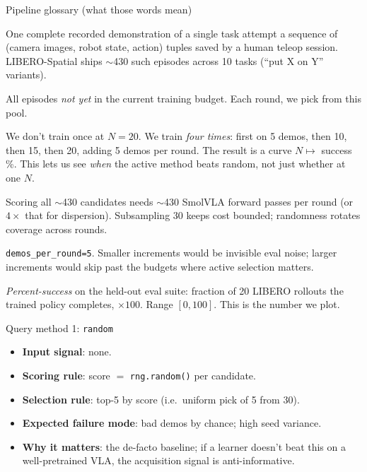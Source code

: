 \documentclass[aspectratio=169]{beamer}
\begin{document}
\begin{frame}{Pipeline glossary (what those words mean)}
\footnotesize
\begin{description}
  \setlength{\itemsep}{0.35em}
  \item[Episode] One complete recorded demonstration of a single task attempt \textemdash{} a sequence of (camera images, robot state, action) tuples saved by a human teleop session. LIBERO-Spatial ships $\sim$430 such episodes across 10 tasks (``put X on Y'' variants).

  \item[Candidate pool] All episodes \emph{not yet} in the current training budget. Each round, we pick from this pool.

  \item[Budget schedule \boldmath$N{=}5\to10\to15\to20$] We don't train once at $N{=}20$. We train \emph{four times}: first on 5 demos, then 10, then 15, then 20, adding 5 demos per round. The result is a curve $N \mapsto $ success\,\%. This lets us see \emph{when} the active method beats random, not just whether at one $N$.

  \item[Why subsample 30 random candidates?] Scoring all $\sim$430 candidates needs $\sim$430 SmolVLA forward passes per round (or $4\times$ that for dispersion). Subsampling 30 keeps cost bounded; randomness rotates coverage across rounds.

  \item[Why add top-5 each round?] \texttt{demos\_per\_round=5}. Smaller increments would be invisible eval noise; larger increments would skip past the budgets where active selection matters.

  \item[\texttt{pc\_success}] \emph{Percent-success} on the held-out eval suite: fraction of 20 LIBERO rollouts the trained policy completes, $\times 100$. Range $[0, 100]$. This is the number we plot.
\end{description}
\end{frame}

\begin{frame}{Query method 1: \texttt{random}}
\begin{itemize}
  \item \textbf{Input signal}: none.
  \item \textbf{Scoring rule}: score $=$ \texttt{rng.random()} per candidate.
  \item \textbf{Selection rule}: top-5 by score (i.e.\ uniform pick of 5 from 30).
  \item \textbf{Expected failure mode}: bad demos by chance; high seed variance.
  \item \textbf{Why it matters}: the de-facto baseline; if a learner doesn't beat this on a well-pretrained VLA, the acquisition signal is anti-informative.
\end{itemize}
\end{frame}
\end{document}
